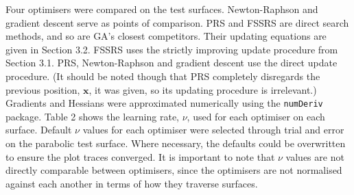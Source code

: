 \documentclass[
  a4paper,
  DIV=11,
  numbers=noendperiod]{scrartcl}
\newcommand{\B}[1]{\boldsymbol{#1}}
\newcommand{\+}{\phantom{-}}
\begin{document}
Four optimisers were compared on the test surfaces. Newton-Raphson and
gradient descent serve as points of comparison. PRS and FSSRS are direct
search methods, and so are GA's closest competitors. Their updating
equations are given in Section 3.2. FSSRS uses the strictly improving
update procedure from Section 3.1. PRS, Newton-Raphson and gradient
descent use the direct update procedure. (It should be noted though that
PRS completely disregards the previous position, \(\B x\), it was given,
so its updating procedure is irrelevant.) Gradients and Hessians were
approximated numerically using the \texttt{numDeriv} package. Table 2
shows the learning rate, \(\nu\), used for each optimiser on each
surface. Default \(\nu\) values for each optimiser were selected through
trial and error on the parabolic test surface. Where necessary, the
defaults could be overwritten to ensure the plot traces converged. It is
important to note that \(\nu\) values are not directly comparable
between optimisers, since the optimisers are not normalised against each
another in terms of how they traverse surfaces.
\end{document}
